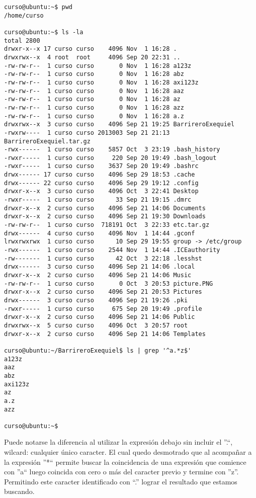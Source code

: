 \documentclass[a4paper,11pt,spanish]{article} %
\newenvironment{myscriptlisting}
{\begin{list}{}{\setlength{\leftmargin}{1em}}\item\scriptsize\bfseries}
{\end{list}}
\begin{document}
\begin{myscriptlisting}
 \begin{verbatim}
curso@ubuntu:~$ pwd
/home/curso

curso@ubuntu:~$ ls -la
total 2800
drwxr-x--x 17 curso curso    4096 Nov  1 16:28 .
drwxrwx--x  4 root  root     4096 Sep 20 22:31 ..
-rw-rw-r--  1 curso curso       0 Nov  1 16:28 a123z
-rw-rw-r--  1 curso curso       0 Nov  1 16:28 abz
-rw-rw-r--  1 curso curso       0 Nov  1 16:28 axi123z
-rw-rw-r--  1 curso curso       0 Nov  1 16:28 aaz
-rw-rw-r--  1 curso curso       0 Nov  1 16:28 az
-rw-rw-r--  1 curso curso       0 Nov  1 16:28 azz
-rw-rw-r--  1 curso curso       0 Nov  1 16:28 a.z
drwxrwx--x  3 curso curso    4096 Sep 21 19:25 BarrireroExequiel
-rwxrw----  1 curso curso 2013003 Sep 21 21:13 BarrireroExequiel.tar.gz
-rwx------  1 curso curso    5857 Oct  3 23:19 .bash_history
-rwxr-----  1 curso curso     220 Sep 20 19:49 .bash_logout
-rwxr-----  1 curso curso    3637 Sep 20 19:49 .bashrc
drwx------ 17 curso curso    4096 Sep 29 18:53 .cache
drwx------ 22 curso curso    4096 Sep 29 19:12 .config
drwxr-x--x  3 curso curso    4096 Oct  3 22:41 Desktop
-rwxr-----  1 curso curso      33 Sep 21 19:15 .dmrc
drwxr-x--x  2 curso curso    4096 Sep 21 14:06 Documents
drwxr-x--x  2 curso curso    4096 Sep 21 19:30 Downloads
-rw-rw-r--  1 curso curso  718191 Oct  3 22:33 etc.tar.gz
drwx------  4 curso curso    4096 Nov  1 14:44 .gconf
lrwxrwxrwx  1 curso curso      10 Sep 29 19:55 group -> /etc/group
-rwx------  1 curso curso    2544 Nov  1 14:44 .ICEauthority
-rw-------  1 curso curso      42 Oct  3 22:18 .lesshst
drwx------  3 curso curso    4096 Sep 21 14:06 .local
drwxr-x--x  2 curso curso    4096 Sep 21 14:06 Music
-rw-rw-r--  1 curso curso       0 Oct  3 20:53 picture.PNG
drwxr-x--x  2 curso curso    4096 Sep 21 20:53 Pictures
drwx------  3 curso curso    4096 Sep 21 19:26 .pki
-rwxr-----  1 curso curso     675 Sep 20 19:49 .profile
drwxr-x--x  2 curso curso    4096 Sep 21 14:06 Public
drwxrwx--x  5 curso curso    4096 Oct  3 20:57 root
drwxr-x--x  2 curso curso    4096 Sep 21 14:06 Templates

curso@ubuntu:~/BarrireroExequiel$ ls | grep '^a.*z$'
a123z
aaz
abz
axi123z
az
a.z
azz

curso@ubuntu:~$ 

 \end{verbatim}
\end{myscriptlisting}

Puede notarse la diferencia al utilizar la expresión debajo sin incluir
el ''.``, wilcard: cualquier único caracter. El cual quedo desmotrado que 
al acompañar a la expresión ''*`` permite buscar la coincidencia de una 
expresión que comience con ''a`` luego coincida con cero
o más del caracter previo y termine con ''z''. Permitindo este caracter identificado con
``.'' lograr el resultado que estamos buscando.
\end{document}
